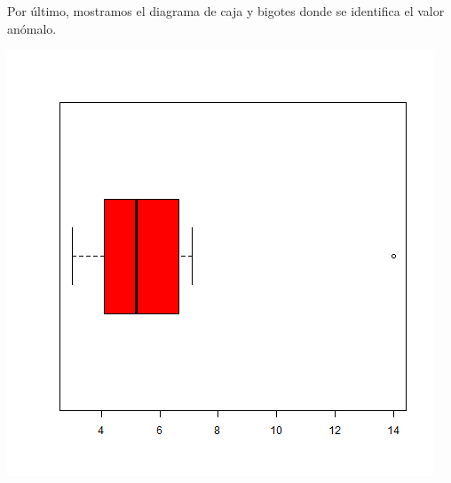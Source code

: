 \documentclass [a4paper] {article}
\begin{document}
\bigskip
Por último, mostramos el diagrama de caja y bigotes donde se identifica el valor anómalo.
\begin{Schunk}
\end{Schunk}

\includegraphics[width=\textwidth]{bigotes}
\end{document}
